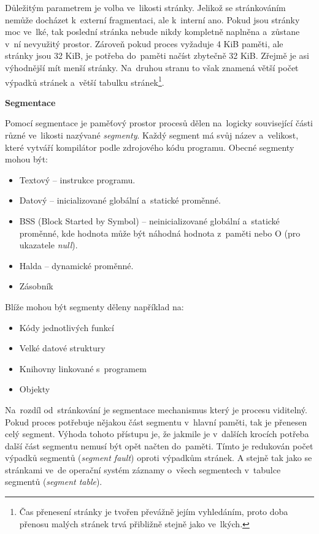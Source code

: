 Důležitým parametrem je volba ve~likosti stránky. Jelikož se stránkováním nemůže docházet k~externí fragmentaci, ale k~interní ano. Pokud jsou stránky moc ve~lké, tak poslední stránka nebude nikdy kompletně naplněna a~zůstane v~ní nevyužitý prostor. Zároveň pokud proces vyžaduje 4 KiB paměti, ale stránky jsou 32 KiB, je potřeba do~paměti načíst zbytečně 32 KiB. Zřejmě je asi výhodnější mít menší stránky. Na~druhou stranu to však znamená větší počet výpadků stránek a~větší tabulku stránek\footnote{Čas přenesení stránky je tvořen převážně jejím vyhledáním, proto doba přenosu malých stránek trvá přibližně stejně jako ve~lkých.}. 

\clearpage

\begin{Large}
	\vspace{0,5cm}
	\textbf{Segmentace}
\end{Large}

Pomocí segmentace je paměťový prostor procesů dělen na~logicky související části různé ve~likosti nazývané \emph{segmenty}. Každý segment má svůj název a~velikost, které vytváří kompilátor podle zdrojového kódu programu. Obecné segmenty mohou být:

\begin{itemize}
	\item Textový -- instrukce programu.
	\item Datový -- inicializované globální a~statické proměnné.
	\item BSS (Block Started by Symbol) -- neinicializované globální a~statické proměnné, kde hodnota může být náhodná hodnota z~paměti nebo O (pro ukazatele \emph{null}).
	\item Halda -- dynamické proměnné.
	\item Zásobník
\end{itemize}

Blíže mohou být segmenty děleny například na:

\begin{itemize}
	\item Kódy jednotlivých funkcí
	\item Velké datové struktury
	\item Knihovny linkované s~programem 
	\item Objekty
\end{itemize}

Na~rozdíl od~stránkování je segmentace mechanismus který je procesu viditelný. Pokud proces potřebuje nějakou část segmentu v~hlavní paměti, tak je přenesen celý segment. Výhoda tohoto přístupu je, že jakmile je v~dalších krocích potřeba další část segmentu nemusí být opět načten do~paměti. Tímto je redukován počet výpadků segmentů (\emph{segment fault}) oproti výpadkům stránek. A stejně tak jako se stránkami ve~de operační systém záznamy o~všech segmentech v~tabulce segmentů (\emph{segment table}). 

